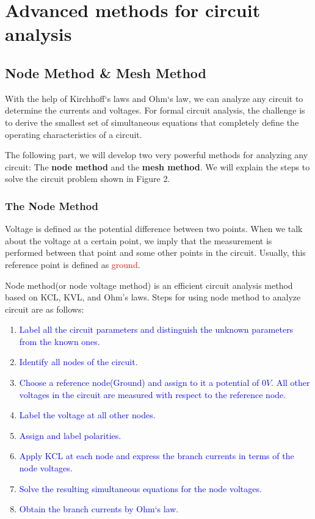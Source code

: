\documentclass[a4 paper]{article}
\newcommand{\blue}[1]{\textcolor{blue}{#1}}
\newcommand{\red}[1]{\textcolor{red}{#1}}
\numberwithin{equation}{section}
\newcommand{\0}{\mathbf{0}}
\begin{document}
\section{Advanced methods for circuit analysis}
\subsection{Node Method \& Mesh Method}
With the help of Kirchhoff`s laws and Ohm`s law, we can analyze any circuit to determine the currents and voltages. For formal circuit analysis, the challenge is to derive the smallest set of simultaneous equations that completely define the operating characteristics of a circuit.

The following part, we will develop two very powerful methods for analyzing any circuit: The {\bf node method} and the {\bf mesh method}. We will explain the steps to solve the circuit problem shown in Figure 2.











\subsubsection{The Node Method}


Voltage is defined as the potential difference between two points. When we talk about the voltage at a certain point, we imply that the measurement is performed between that point and some other points in the circuit. Usually, this reference point is defined as \red{ground}.

Node method(or node voltage method) is an efficient circuit analysis method based on KCL, KVL, and Ohm's laws. Steps for using node method to analyze circuit are as follows:

\begin{enumerate} \itemsep1pt \parskip0pt 
  \item \blue{Label all the circuit parameters and distinguish the unknown parameters from the known ones.}
  \item \blue{Identify all nodes of the circuit.}
  \item \blue{Choose a reference node(Ground) and assign to it a potential of $0V$. All other voltages in the circuit are measured with respect to the reference node.}
  \item \blue{Label the voltage at all other nodes.}
  \item \blue{Assign and label polarities.}
  \item \blue{Apply KCL at each node and express the branch currents in terms of the node voltages.}
  \item \blue{Solve the resulting simultaneous equations for the node voltages.}
  \item \blue{Obtain the branch currents by Ohm`s law.}
\end{enumerate}
\end{document}
